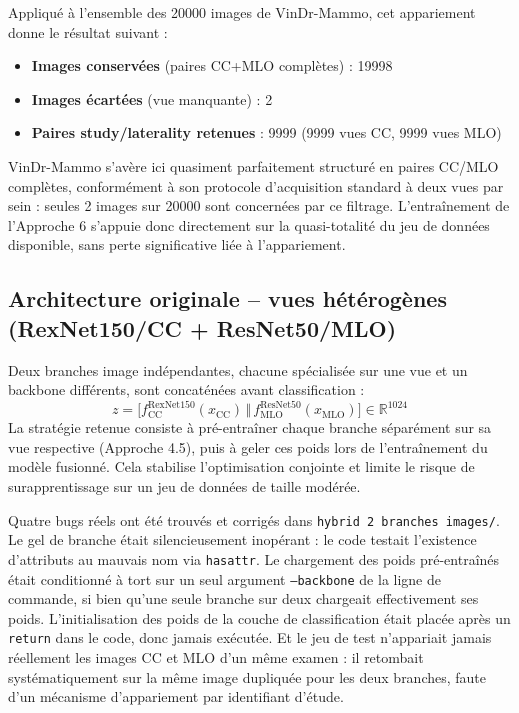\documentclass[12pt,a4paper]{report}
\begin{document}
Appliqué à l'ensemble des 20000 images de VinDr-Mammo, cet appariement donne
le résultat suivant :
\begin{itemize}
    \item \textbf{Images conservées} (paires CC+MLO complètes) : 19998
    \item \textbf{Images écartées} (vue manquante) : 2
    \item \textbf{Paires study/laterality retenues} : 9999 (9999 vues CC, 9999
    vues MLO)
\end{itemize}
VinDr-Mammo s'avère ici quasiment parfaitement structuré en paires CC/MLO
complètes, conformément à son protocole d'acquisition standard à deux vues
par sein : seules 2 images sur 20000 sont concernées par ce filtrage.
L'entraînement de l'Approche 6 s'appuie donc directement sur la
quasi-totalité du jeu de données disponible, sans perte significative liée
à l'appariement.

\subsection{Architecture originale -- vues hétérogènes (RexNet150/CC + ResNet50/MLO)}
Deux branches image indépendantes, chacune spécialisée sur une vue et un
backbone différents, sont concaténées avant classification :
\[
  z = \big[f^{\text{RexNet150}}_{\text{CC}}(x_{\text{CC}})
  \,\Vert\, f^{\text{ResNet50}}_{\text{MLO}}(x_{\text{MLO}})\big]
  \in \mathbb{R}^{1024}
\]
La stratégie retenue consiste à pré-entraîner chaque branche séparément sur
sa vue respective (Approche 4.5), puis à geler ces poids lors de
l'entraînement du modèle fusionné. Cela stabilise l'optimisation conjointe
et limite le risque de surapprentissage sur un jeu de données de taille
modérée.

Quatre bugs réels ont été trouvés et corrigés dans
\texttt{hybrid~2~branches~images/}. Le gel de branche était silencieusement
inopérant : le code testait l'existence d'attributs au mauvais nom via
\texttt{hasattr}. Le chargement des poids pré-entraînés était conditionné à
tort sur un seul argument \texttt{--backbone} de la ligne de commande, si
bien qu'une seule branche sur deux chargeait effectivement ses poids.
L'initialisation des poids de la couche de classification était placée
après un \texttt{return} dans le code, donc jamais exécutée. Et le jeu de
test n'appariait jamais réellement les images CC et MLO d'un même examen :
il retombait systématiquement sur la même image dupliquée pour les deux
branches, faute d'un mécanisme d'appariement par identifiant d'étude.
\end{document}
